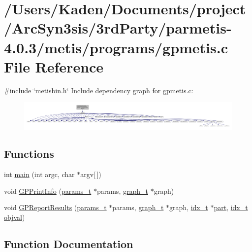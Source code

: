 \hypertarget{a00311}{}\section{/\+Users/\+Kaden/\+Documents/project/\+Arc\+Syn3sis/3rd\+Party/parmetis-\/4.0.3/metis/programs/gpmetis.c File Reference}
\label{a00311}
{\ttfamily \#include \char`\"{}metisbin.\+h\char`\"{}}\newline
Include dependency graph for gpmetis.\+c\+:\nopagebreak
\begin{figure}[H]
\begin{center}
\leavevmode
\includegraphics[width=350pt]{a00312}
\end{center}
\end{figure}
\subsection*{Functions}
\begin{DoxyCompactItemize}
\item 
int \hyperlink{a00311_a0ddf1224851353fc92bfbff6f499fa97}{main} (int argc, char $\ast$argv\mbox{[}$\,$\mbox{]})
\item 
void \hyperlink{a00311_a621f3f8c2f9b93614ecb2fdf86a6cc53}{G\+P\+Print\+Info} (\hyperlink{a00706}{params\+\_\+t} $\ast$params, \hyperlink{a00734}{graph\+\_\+t} $\ast$graph)
\item 
void \hyperlink{a00311_af57a862e6ce57a691244341103615ed2}{G\+P\+Report\+Results} (\hyperlink{a00706}{params\+\_\+t} $\ast$params, \hyperlink{a00734}{graph\+\_\+t} $\ast$graph, \hyperlink{a00876_aaa5262be3e700770163401acb0150f52}{idx\+\_\+t} $\ast$\hyperlink{a00879_a0a9ea8670f88d6db1e021fee2dcd94be}{part}, \hyperlink{a00876_aaa5262be3e700770163401acb0150f52}{idx\+\_\+t} \hyperlink{a00879_a3cb2fc01fde2f4d088a9c5bc8da62b0a}{objval})
\end{DoxyCompactItemize}


\subsection{Function Documentation}
\mbox{\label{a00311_a621f3f8c2f9b93614ecb2fdf86a6cc53}} 
